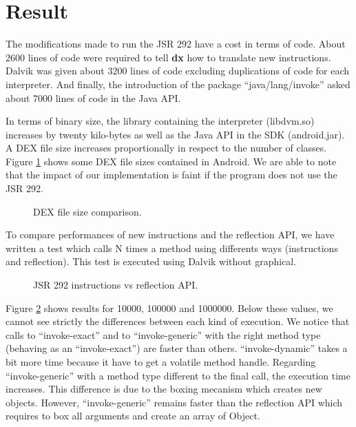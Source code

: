 \documentclass{sig-alternate}
\def \DALVIK{Dalvik\xspace}
\def \Jsr{JSR\xspace}
\def \JSR{\Jsr 292\xspace}
\newcommand{\fixme}[1]{{\color{red}FIXME #1}}
\begin{document}
\section{Result}
 \label{result}

  The modifications made to run the \JSR have a cost in terms of code.
  About 2600 lines of code were required to tell {\bf dx} how to translate new instructions.
  Dalvik was given about 3200 lines of code excluding duplications of code for each interpreter.
  And finally, the introduction of the package ``java/lang/invoke'' asked about 7000 lines of code in the Java API.


  In terms of binary size, the library containing the interpreter (libdvm.so) increases by twenty kilo-bytes as well as the Java API in the SDK (android.jar).
  A DEX file size increases proportionally in respect to the number of classes.
  Figure \ref{Rsize} shows some DEX file sizes contained in Android.
  We are able to note that the impact of our implementation is faint if the program does not use the \JSR.

  \begin{figure}[h]
    \dataset
    \resizebox{\linewidth}{!}{}
    \caption{DEX file size comparison.}
    \label{Rsize}
  \end{figure}

  To compare performances of new instructions and the reflection API,
  we have written a test which calls N times a method using differents ways (instructions and reflection).
  This test is executed using \DALVIK without graphical.

  \begin{figure}[!h]
    \resizebox{\linewidth}{!}{}
    \caption{JSR 292 instructions vs reflection API.}
    \label{Rinvoke}
  \end{figure}

  Figure \ref{Rinvoke} shows results for 10000, 100000 and 1000000.
  Below these values, we cannot see strictly the differences between each kind of execution.
  We notice that calls to ``invoke-exact'' and to ``invoke-generic'' with the right method type (behaving as an ``invoke-exact'') are faster than others.
  ``invoke-dynamic'' takes a bit more time because it have to get a volatile method handle.
  Regarding ``invoke-generic'' with a method type different to the final call, the execution time increases.
  This difference is due to the boxing mecanism which creates new objects.
  However, ``invoke-generic'' remains faster than the reflection API which requires to box all arguments and create an array of Object.\\
  
\end{document}
